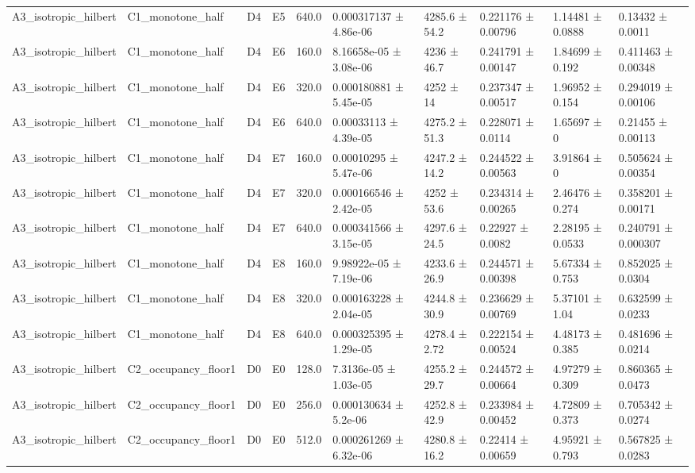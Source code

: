 \begin{table}
\begin{tabular}{llllllllll}
A3\_isotropic\_hilbert & C1\_monotone\_half & D4 & E5 & 640.0 & 0.000317137 ± 4.86e-06 & 4285.6 ± 54.2 & 0.221176 ± 0.00796 & 1.14481 ± 0.0888 & 0.13432 ± 0.0011 \\
A3\_isotropic\_hilbert & C1\_monotone\_half & D4 & E6 & 160.0 & 8.16658e-05 ± 3.08e-06 & 4236 ± 46.7 & 0.241791 ± 0.00147 & 1.84699 ± 0.192 & 0.411463 ± 0.00348 \\
A3\_isotropic\_hilbert & C1\_monotone\_half & D4 & E6 & 320.0 & 0.000180881 ± 5.45e-05 & 4252 ± 14 & 0.237347 ± 0.00517 & 1.96952 ± 0.154 & 0.294019 ± 0.00106 \\
A3\_isotropic\_hilbert & C1\_monotone\_half & D4 & E6 & 640.0 & 0.00033113 ± 4.39e-05 & 4275.2 ± 51.3 & 0.228071 ± 0.0114 & 1.65697 ± 0 & 0.21455 ± 0.00113 \\
A3\_isotropic\_hilbert & C1\_monotone\_half & D4 & E7 & 160.0 & 0.00010295 ± 5.47e-06 & 4247.2 ± 14.2 & 0.244522 ± 0.00563 & 3.91864 ± 0 & 0.505624 ± 0.00354 \\
A3\_isotropic\_hilbert & C1\_monotone\_half & D4 & E7 & 320.0 & 0.000166546 ± 2.42e-05 & 4252 ± 53.6 & 0.234314 ± 0.00265 & 2.46476 ± 0.274 & 0.358201 ± 0.00171 \\
A3\_isotropic\_hilbert & C1\_monotone\_half & D4 & E7 & 640.0 & 0.000341566 ± 3.15e-05 & 4297.6 ± 24.5 & 0.22927 ± 0.0082 & 2.28195 ± 0.0533 & 0.240791 ± 0.000307 \\
A3\_isotropic\_hilbert & C1\_monotone\_half & D4 & E8 & 160.0 & 9.98922e-05 ± 7.19e-06 & 4233.6 ± 26.9 & 0.244571 ± 0.00398 & 5.67334 ± 0.753 & 0.852025 ± 0.0304 \\
A3\_isotropic\_hilbert & C1\_monotone\_half & D4 & E8 & 320.0 & 0.000163228 ± 2.04e-05 & 4244.8 ± 30.9 & 0.236629 ± 0.00769 & 5.37101 ± 1.04 & 0.632599 ± 0.0233 \\
A3\_isotropic\_hilbert & C1\_monotone\_half & D4 & E8 & 640.0 & 0.000325395 ± 1.29e-05 & 4278.4 ± 2.72 & 0.222154 ± 0.00524 & 4.48173 ± 0.385 & 0.481696 ± 0.0214 \\
A3\_isotropic\_hilbert & C2\_occupancy\_floor1 & D0 & E0 & 128.0 & 7.3136e-05 ± 1.03e-05 & 4255.2 ± 29.7 & 0.244572 ± 0.00664 & 4.97279 ± 0.309 & 0.860365 ± 0.0473 \\
A3\_isotropic\_hilbert & C2\_occupancy\_floor1 & D0 & E0 & 256.0 & 0.000130634 ± 5.2e-06 & 4252.8 ± 42.9 & 0.233984 ± 0.00452 & 4.72809 ± 0.373 & 0.705342 ± 0.0274 \\
A3\_isotropic\_hilbert & C2\_occupancy\_floor1 & D0 & E0 & 512.0 & 0.000261269 ± 6.32e-06 & 4280.8 ± 16.2 & 0.22414 ± 0.00659 & 4.95921 ± 0.793 & 0.567825 ± 0.0283 \\

\end{tabular}
\end{table}
